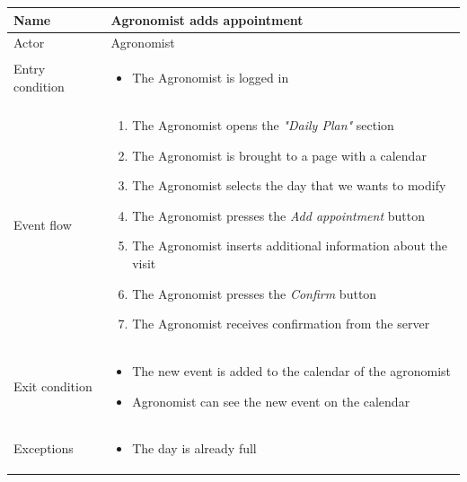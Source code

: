 \begin{table}[H]
    \begin{tabu} to \textwidth {|X|X[4]|}
        \hline
        Name            & Agronomist adds appointment      \\ \hline
        Actor           & Agronomist                      \\ \hline
        Entry condition & \begin{itemize}
            \item The Agronomist is logged in
        \end{itemize} \\ \hline
        Event flow      & \begin{enumerate}
            \item The Agronomist opens the \emph{"Daily Plan"} section
            \item The Agronomist is brought to a page with a calendar 
            \item The Agronomist selects the day that we wants to modify
            \item The Agronomist presses the \emph{Add appointment} button
            \item The Agronomist inserts additional information about the visit
            \item The Agronomist presses the \emph{Confirm} button
            \item The Agronomist receives confirmation from the server
        \end{enumerate} \\ \hline
        Exit condition  & \begin{itemize}
            \item The new event is added to the calendar of the agronomist
            \item Agronomist can see the new event on the calendar
        \end{itemize} \\ \hline
        Exceptions      & \begin{itemize}
            \item The day is already full
        \end{itemize} \\ \hline
    \end{tabu}
\end{table}


